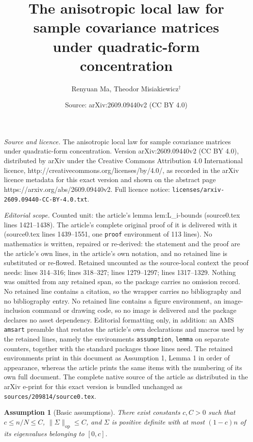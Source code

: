 \documentclass[10pt,a4paper]{amsart}
\title{The anisotropic local law for sample covariance matrices\\ under quadratic-form concentration}
\author{Renyuan Ma, Theodor Misiakiewicz$^{\dagger}$}
\date{Source: arXiv:2609.09440v2 (CC BY 4.0)}
\newtheorem{assumption}{Assumption}
\def\op{\mathrm{op}}
\begin{document}
\maketitle

\noindent\emph{Source and licence.} The anisotropic local law for sample covariance matrices\\ under quadratic-form concentration. Version arXiv:2609.09440v2 (CC BY 4.0), distributed by arXiv under the Creative Commons Attribution 4.0 International licence, http://creativecommons.org/licenses/by/4.0/, as recorded in the arXiv licence metadata for this exact version and shown on the abstract page https://arxiv.org/abs/2609.09440v2. Full licence notice: \texttt{licenses/arxiv-2609.09440-CC-BY-4.0.txt}.\par\smallskip

\noindent\textit{Editorial scope.} Counted unit: the article's lemma lem:L\_i-bounds (source0.tex lines 1421--1438). The article's complete original proof of it is delivered with it (source0.tex lines 1439--1551, one \texttt{proof} environment of 113 lines). No mathematics is written, repaired or re-derived: the statement and the proof are the article's own lines, in the article's own notation, and no retained line is substituted or re-flowed.  Retained uncounted as the source-local context the proof needs: lines 314--316; lines 318--327; lines 1279--1297; lines 1317--1329.  Nothing was omitted from any retained span, so the package carries no omission record.  No retained line contains a citation, so the wrapper carries no bibliography and no bibliography entry.  No retained line contains a figure environment, an image-inclusion command or drawing code, so no image is delivered and the package declares no asset dependency.  Editorial formatting only, in addition: an AMS \texttt{amsart} preamble that restates the article's own declarations and macros used by the retained lines, namely the environments \texttt{assumption}, \texttt{lemma} on separate counters, together with the standard packages those lines need.  The retained environments print in this document as Assumption 1, Lemma 1 in order of appearance, whereas the article prints the same items with the numbering of its own full document.  The complete native source of the article as distributed in the arXiv e-print for this exact version is bundled unchanged as \texttt{sources/209814/source0.tex}.
\begin{assumption}[Basic assumptions]\label{ass:A1}
    There exist constants $c,C >0$ such that $c\le n/N\le C$, $\| \Sigma \|_\op \leq C$, and $\Sigma$ is positive definite with at most $(1-c)n$ of its eigenvalues belonging to $[0,c]$.
\end{assumption}
\end{document}
